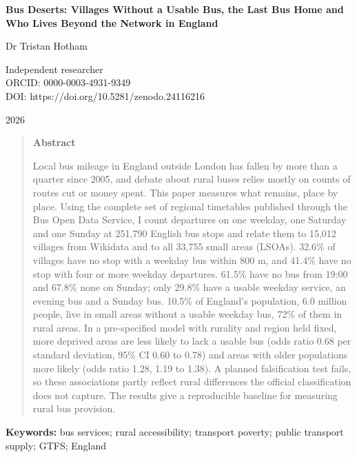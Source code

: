 \documentclass[11pt,a4paper]{article}
\begin{document}
\begin{center}
{\Large\bfseries Bus Deserts: Villages Without a Usable Bus, the Last Bus Home and Who Lives Beyond the Network in England\par}
\vspace{1.2em}
{\large Dr Tristan Hotham\par}
\vspace{0.3em}
{\small Independent researcher\\
ORCID: 0000-0003-4931-9349\\
DOI: https://doi.org/10.5281/zenodo.24116216\par}
\vspace{0.8em}
2026
\end{center}

\begin{quote}
\small
\begin{center}\textbf{Abstract}\end{center}
Local bus mileage in England outside London has fallen by more than a quarter since 2005, and debate about rural buses relies mostly on counts of routes cut or money spent. This paper measures what remains, place by place. Using the complete set of regional timetables published through the Bus Open Data Service, I count departures on one weekday, one Saturday and one Sunday at 251,790 English bus stops and relate them to 15,012 villages from Wikidata and to all 33,755 small areas (LSOAs). 32.6\% of villages have no stop with a weekday bus within 800 m, and 41.4\% have no stop with four or more weekday departures. 61.5\% have no bus from 19:00 and 67.8\% none on Sunday; only 29.8\% have a usable weekday service, an evening bus and a Sunday bus. 10.5\% of England's population, 6.0 million people, live in small areas without a usable weekday bus, 72\% of them in rural areas. In a pre-specified model with rurality and region held fixed, more deprived areas are less likely to lack a usable bus (odds ratio 0.68 per standard deviation, 95\% CI 0.60 to 0.78) and areas with older populations more likely (odds ratio 1.28, 1.19 to 1.38). A planned falsification test fails, so these associations partly reflect rural differences the official classification does not capture. The results give a reproducible baseline for measuring rural bus provision.
\end{quote}
{\small\textbf{Keywords:} bus services; rural accessibility; transport poverty; public transport supply; GTFS; England\par}
\end{document}
